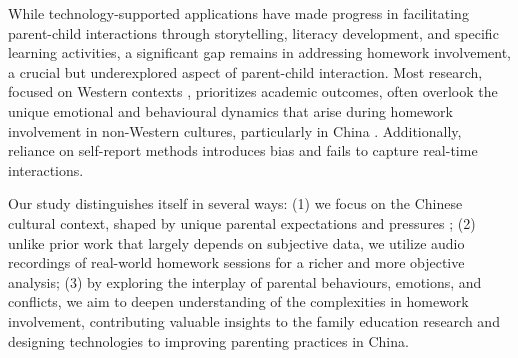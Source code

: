 While technology-supported applications have made progress in facilitating parent-child interactions through storytelling, literacy development, and specific learning activities, a significant gap remains in addressing homework involvement, a crucial but underexplored aspect of parent-child interaction. Most research, focused on Western contexts \cite{pomerantz2007whom, patall2008parent, dettmers2019antecedents}, prioritizes academic outcomes, often overlook the unique emotional and behavioural dynamics that arise during homework involvement in non-Western cultures, particularly in China \cite{kim2013parents, gan2019parental, wang2021parental}. Additionally, reliance on self-report methods \cite{gan2019parental, patall2008parent} introduces bias and fails to capture real-time interactions.




Our study distinguishes itself in several ways: (1) we focus on the Chinese cultural context, shaped by unique parental expectations and pressures \cite{kim2013parents, suarez2022parental}; (2) unlike prior work that largely depends on subjective data, we utilize audio recordings of real-world homework sessions for a richer and more objective analysis; (3) by exploring the interplay of parental behaviours, emotions, and conflicts, we aim to deepen understanding of the complexities in homework involvement, contributing valuable insights to the family education research and designing technologies to improving parenting practices in China.
